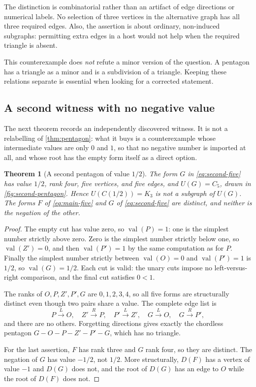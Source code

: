 \documentclass[11pt,a4paper]{article}
\numberwithin{equation}{section}
\newtheorem{theorem}{Theorem}[section]
\theoremstyle{definition}
\theoremstyle{remark}
\newcommand{\val}{\operatorname{val}}
\newcommand{\can}{C}
\begin{document}
The distinction is combinatorial rather than an artifact of edge directions or
numerical labels. No selection of three vertices in the alternative graph has
all three required edges. Also, the assertion is about ordinary, non-induced
subgraphs: permitting extra edges in a host would not help when the required
triangle is absent.

This counterexample does \emph{not} refute a minor version of the question. A
pentagon has a triangle as a minor and is a subdivision of a triangle. Keeping
these relations separate is essential when looking for a corrected statement.

\subsection{A second witness with no negative value}
\label{sec:second-witness}

The next theorem records an independently discovered witness. It is not a
relabelling of \cref{thm:pentagon}: what it buys is a counterexample whose
intermediate values are only $0$ and $1$, so that no negative number is imported
at all, and whose root has the empty form itself as a direct option.

\begin{theorem}[A second pentagon of value $1/2$]
\label{thm:second-pentagon}
The form $G$ in \eqref{eq:second-five} has value $1/2$, rank four, five vertices,
and five edges, and $U(G)=C_5$, drawn in \cref{fig:second-pentagon}. Hence
$U(\can(1/2))=K_3$ is not a subgraph of $U(G)$. The forms $F$ of \eqref{eq:main-five} and $G$ of \eqref{eq:second-five}
are distinct, and neither is the negation of the other.
\end{theorem}

\begin{proof}
The empty cut has value zero, so $\val(P)=1$: one is the simplest number
strictly above zero. Zero is the simplest number strictly below one, so
$\val(Z')=0$, and then $\val(P')=1$ by the same computation as for $P$. Finally
the simplest number strictly between $\val(O)=0$ and $\val(P')=1$ is $1/2$, so
$\val(G)=1/2$. Each cut is valid: the unary cuts impose no left-versus-right
comparison, and the final cut satisfies $0<1$.

The ranks of $O,P,Z',P',G$ are $0,1,2,3,4$, so all five forms are structurally
distinct even though two pairs share a value. The complete edge list is
\begin{equation}
\label{eq:second-edges}
 P\xrightarrow{\;L\;}O,\quad
 Z'\xrightarrow{\;R\;}P,\quad
 P'\xrightarrow{\;L\;}Z',\quad
 G\xrightarrow{\;L\;}O,\quad
 G\xrightarrow{\;R\;}P',
\end{equation}
and there are no others. Forgetting directions gives exactly the chordless
pentagon $G-O-P-Z'-P'-G$, which has no triangle.

For the last assertion, $F$ has rank three and $G$ rank four, so they are
distinct. The negation of $G$ has value $-1/2$, not $1/2$. More structurally,
$D(F)$ has a vertex of value $-1$ and $D(G)$ does not, and the root of $D(G)$ has
an edge to $O$ while the root of $D(F)$ does not.
\end{proof}
\end{document}
